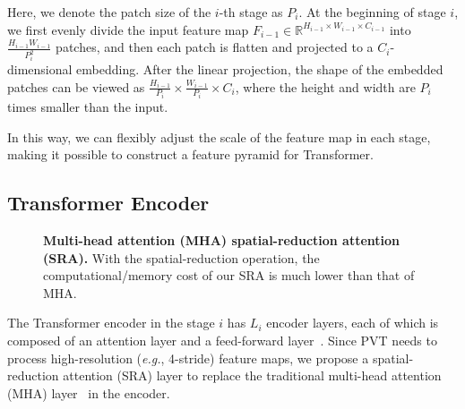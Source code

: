\documentclass[10pt,twocolumn,letterpaper]{article}
\def\eg{\emph{e.g.}}
\begin{document}
%
Here, we denote the patch size of the $i$-th stage as $P_i$.
%
At the beginning of stage $i$, we first evenly divide the input feature map $F_{i\!-\!1}\!\in\! \mathbb{R}^{H_{i\!-\!1}\!\times\!W_{i\!-\!1}\!\times\! C_{i\!-\!1}}$ into $\frac{H_{i\!-\!1}W_{i\!-\!1}}{P_i^2}$ patches, 
%
and then each patch is flatten and projected to a $C_i$-dimensional embedding. 
%
After the linear projection, the shape of the embedded patches can be viewed as $\frac{H_{i\!-\!1}}{P_i}\!\times\!\frac{W_{i\!-\!1}}{P_i}\!\times\!C_i$, where the height and width are $P_i$ times smaller than the input.

In this way, we can flexibly adjust the scale of the feature map in each stage, making it possible to construct a feature pyramid for Transformer.


\subsection{Transformer Encoder}


\begin{figure}
		\centering
		\setlength{\fboxrule}{0pt}
		 
		\caption{\textbf{Multi-head attention (MHA) \vs spatial-reduction attention (SRA).} 
		With the spatial-reduction operation, the computational/memory cost of our SRA is much lower than that of MHA.
		}
		\label{fig:att}
\end{figure}

The Transformer encoder in the stage $i $ has $L_i$ encoder layers, each of which is composed of an attention layer and a feed-forward layer~\cite{vaswani2017attention}.
%
Since PVT needs to process high-resolution (\eg, 4-stride) feature maps, 
%
we propose a spatial-reduction attention (SRA) layer to replace the traditional multi-head attention (MHA) layer~\cite{vaswani2017attention} in the encoder.
\end{document}

